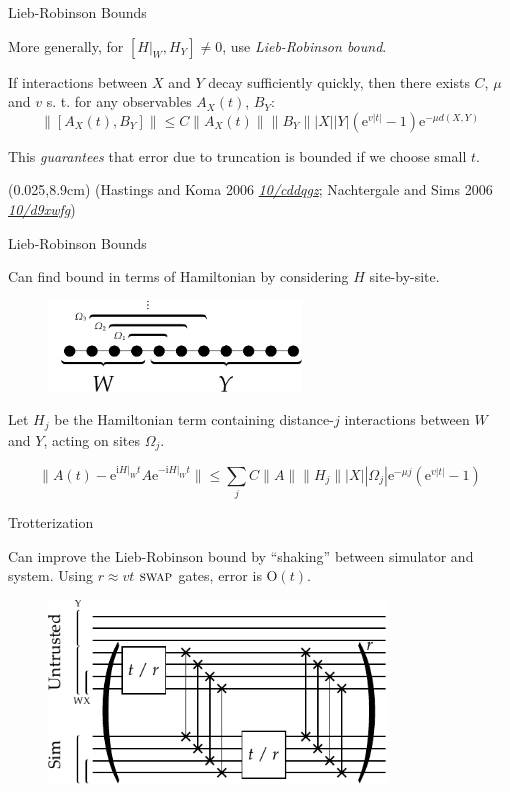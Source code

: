 \documentclass[xcolor=dvipsnames, compress]{beamer}
\renewcommand\UrlFont{\color{red}\rmfamily\itshape}
\newcommand{\shortdoi}[1]{\href{http://doi.org/#1}{\UrlFont 10/#1}}
\newcommand{\ee}{\mathrm{e}}
\newcommand{\ii}{\mathrm{i}}
\newcommand{\OO}{\mathrm{O}}
\newcommand{\swapgt}{\textsc{swap}}
\newcommand{\bottomnote}[1]{
  \begin{textblock*}{0.95\paperwidth} (0.025\paperwidth,8.9cm)
    {\tiny \hfill #1}
  \end{textblock*}
}
\begin{document}
\begin{frame}{Lieb-Robinson Bounds}

  More generally, for $[H|_W, H_Y] \ne 0$, use \emph{Lieb-Robinson bound}.

  If interactions between $X$ and $Y$ decay sufficiently quickly,
  then there exists $C$, $\mu$ and $v$ s. t. for any observables $A_X(t)$, $B_Y$:
  $$
    \|[A_X(t), B_Y]\| \le C \|A_X(t)\| \|B_Y\| |X| |Y| (\ee^{v|t|} - 1) \ee^{-\mu d(X, Y)}
  $$

  This \emph{guarantees} that error due to truncation is bounded if
  we choose small $t$.

  \bottomnote{(Hastings and Koma 2006 \shortdoi{cddqgz}; Nachtergale and Sims 2006 \shortdoi{d9xwfg})}

\end{frame}

\begin{frame}{Lieb-Robinson Bounds}

  Can find bound in terms of Hamiltonian by considering $H$ site-by-site.

  \begin{figure}
    \centering
    \includegraphics[width=0.6\textwidth]{bootstrapping-partition-distance}
  \end{figure}

  Let $H_j$ be the Hamiltonian term containing distance-$j$
  interactions between $W$ and $Y$, acting on sites $\Omega_j$.

  $$
    \|A(t) - \ee^{\ii H|_W t} A \ee^{-\ii H|_W t} \| \le
    \sum_{j} C \|A\| \|H_j\| |X| |\Omega_j| \ee^{-\mu j} (\ee^{v |t|} - 1)
  $$

\end{frame}

\begin{frame}{Trotterization}

  Can improve the Lieb-Robinson bound by ``shaking'' between simulator
  and system. Using $r \approx vt$ $\swapgt$ gates, error is $\OO(t)$.

  \begin{figure}
    \centering
    \includegraphics[width=0.8\textwidth]{shaking}
  \end{figure}

\end{frame}
\end{document}
